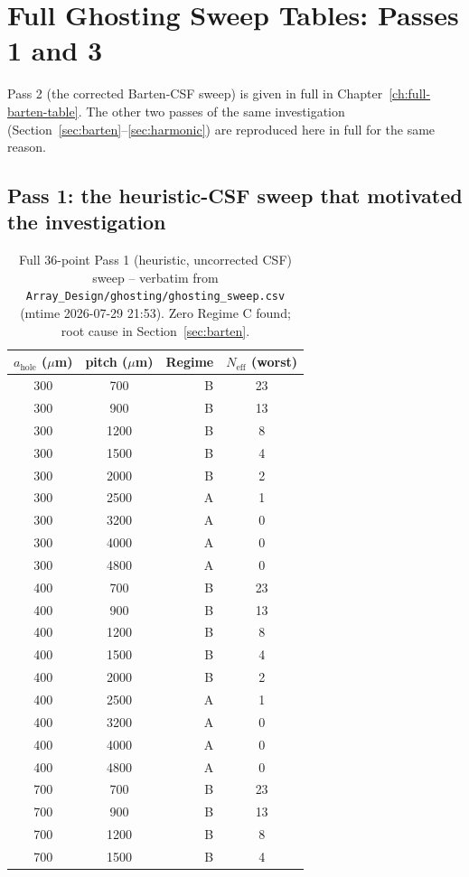\chapter{Full Ghosting Sweep Tables: Passes 1 and 3}
\label{ch:ghosting-passes-1-3}
Pass 2 (the corrected Barten-CSF sweep) is given in full in Chapter~\ref{ch:full-barten-table}. The other two passes of the same investigation (Section~\ref{sec:barten}--\ref{sec:harmonic}) are reproduced here in full for the same reason.

\section{Pass 1: the heuristic-CSF sweep that motivated the investigation}
\begin{longtable}{ccrc}
\caption{Full 36-point Pass 1 (heuristic, uncorrected CSF) sweep -- verbatim from \texttt{Array\_Design/ghosting/ghosting\_sweep.csv} (mtime 2026-07-29 21:53). Zero Regime C found; root cause in Section~\ref{sec:barten}.}\label{tab:full-pass1-sweep}\\
\toprule
$a_{\mathrm{hole}}$ ($\mu$m) & pitch ($\mu$m) & Regime & $N_{\mathrm{eff}}$ (worst) \\
\midrule
\endhead
300 & 700 & B & 23 \\
300 & 900 & B & 13 \\
300 & 1200 & B & 8 \\
300 & 1500 & B & 4 \\
300 & 2000 & B & 2 \\
300 & 2500 & A & 1 \\
300 & 3200 & A & 0 \\
300 & 4000 & A & 0 \\
300 & 4800 & A & 0 \\
400 & 700 & B & 23 \\
400 & 900 & B & 13 \\
400 & 1200 & B & 8 \\
400 & 1500 & B & 4 \\
400 & 2000 & B & 2 \\
400 & 2500 & A & 1 \\
400 & 3200 & A & 0 \\
400 & 4000 & A & 0 \\
400 & 4800 & A & 0 \\
700 & 700 & B & 23 \\
700 & 900 & B & 13 \\
700 & 1200 & B & 8 \\
700 & 1500 & B & 4 \\

\end{longtable}
